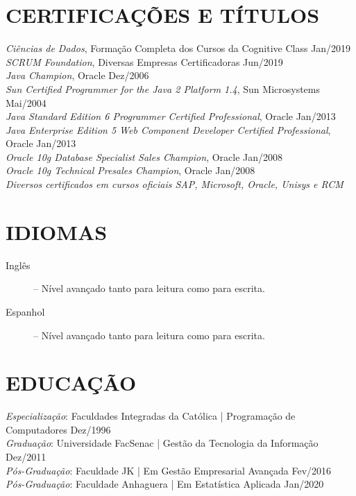 \documentclass{res}
\begin{document}
\begin{resume}
		\section{CERTIFICAÇÕES E TÍTULOS}
		\vspace{8pt}
		{\sl Ciências de Dados}, Formação Completa dos Cursos da Cognitive Class \hfill Jan/2019 \\
		{\sl SCRUM Foundation}, Diversas Empresas Certificadoras \hfill Jun/2019 \\
		{\sl Java Champion}, Oracle \hfill Dez/2006 \\
		{\sl Sun Certified Programmer for the Java 2 Platform 1.4}, Sun Microsystems \hfill Mai/2004 \\
		{\sl Java Standard Edition 6 Programmer Certified Professional}, Oracle \hfill Jan/2013 \\
		{\sl Java Enterprise Edition 5 Web Component Developer Certified Professional}, Oracle \hfill Jan/2013 \\
		{\sl Oracle 10g Database Specialist Sales Champion}, Oracle \hfill Jan/2008 \\
		{\sl Oracle 10g Technical Presales Champion}, Oracle \hfill Jan/2008 \\
		{\sl Diversos certificados em cursos oficiais SAP, Microsoft, Oracle, Unisys e RCM}
		
		\section{IDIOMAS} 
		\vspace{18pt}
		\begin{description}
			\item[Inglês] -- Nível avançado tanto para leitura como para escrita.
			\item[Espanhol] -- Nível avançado tanto para leitura como para escrita.
		\end{description}
		
		\section{EDUCAÇÃO}
		\vspace{8pt} 
		{\sl Especialização}: Faculdades Integradas da Católica | Programação de Computadores 
		\hfill Dez/1996 \\
		{\sl Graduação}: Universidade FacSenac | Gestão da Tecnologia da Informação     
		\hfill Dez/2011 \\
		{\sl Pós-Graduação}: Faculdade JK | Em Gestão Empresarial Avançada 
		\hfill Fev/2016 \\
		{\sl Pós-Graduação}: Faculdade Anhaguera | Em Estatística Aplicada
		\hfill Jan/2020
		

\end{resume}
\end{document}
